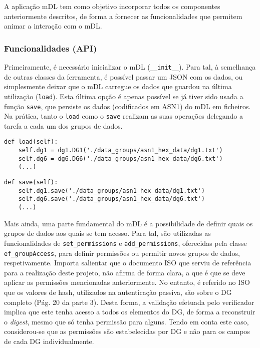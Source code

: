 
A aplicação mDL tem como objetivo incorporar todos os componentes anteriormente descritos, de forma a fornecer as funcionalidades que permitem animar a interação com o mDL\@.

\subsubsection{Funcionalidades (API)}

Primeiramente, é necessário inicializar o mDL (\texttt{\_\_init\_\_}). Para tal, à semelhança de outras classes da ferramenta, é possível passar um JSON com os dados, ou simplesmente deixar que o mDL carregue os dados que guardou na última utilização (\texttt{load}). Esta última opção é apenas possível se já tiver sido usada a função \texttt{save}, que persiste os dados (codificados em ASN1) do mDL em ficheiros. Na prática, tanto o \texttt{load} como o \texttt{save} realizam as suas operações delegando a tarefa a cada um dos grupos de dados.

\begin{Verbatim}[frame=single, framerule=0.5mm]
def load(self):
    self.dg1 = dg1.DG1('./data_groups/asn1_hex_data/dg1.txt')
    self.dg6 = dg6.DG6('./data_groups/asn1_hex_data/dg6.txt')
    (...)
\end{Verbatim}

\begin{Verbatim}[frame=single, framerule=0.5mm]
def save(self):
    self.dg1.save('./data_groups/asn1_hex_data/dg1.txt') 
    self.dg6.save('./data_groups/asn1_hex_data/dg6.txt') 
    (...)
\end{Verbatim}

Mais ainda, uma parte fundamental do mDL é a possibilidade de definir quais os grupos de dados aos quais se tem acesso. Para tal, são utilizadas as funcionalidades de \texttt{set\_permissions} e \texttt{add\_permissions}, oferecidas pela classe \texttt{ef\_groupAccess}, para definir permissões ou permitir novos grupos de dados, respetivamente. Importa salientar que o documento ISO que serviu de referência para a realização deste projeto, não afirma de forma clara, a que é que se deve aplicar as permissões mencionadas anteriormente. No entanto, é referido no ISO que os valores de hash, utilizados na autenticação passiva, são sobre o DG completo (Pág. 20 da parte 3). Desta forma, a validação efetuada pelo verificador implica que este tenha acesso a todos os elementos do DG, de forma a reconstruir o \textit{digest}, mesmo que só tenha permissão para alguns. Tendo em conta este caso, considerou-se que as permissões são estabelecidas por DG e não para os campos de cada DG individualmente.

